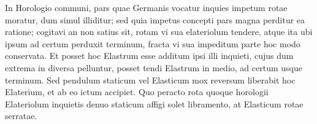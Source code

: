                 \vspace*{8mm}
                \pstart 
                \normalsize
            \noindent[171~r\textsuperscript{o}]
In Horologio\protect{} communi,
pars quae Germanis vocatur inquies\protect{} impetum rotae moratur,
dum simul
illiditur;
sed quia impetus concepti pars magna perditur ea ratione;
cogitavi an non satius sit, rotam vi sua elateriolum\protect{} tendere,
atque ita ubi ipsum ad certum perduxit terminum,
fracta vi sua impeditum
parte hoc modo conservata.
Et posset hoc Elastrum esse additum ipsi illi inquieti,
cujus dum extrema in diversa pelluntur,
posset tendi Elastrum in medio, ad certum usque terminum.
Sed pendulum staticum vel Elasticum mox reversum liberabit hoc Elaterium,
et ab eo ictum accipiet.
Quo peracto rota quoque horologii Elateriolum inquietis denuo
staticum \hspace{-0.15mm}affigi \hspace{-0.2mm}solet \hspace{-0.15mm}libramento,
\hspace{-0.15mm}at \hspace{-0.1mm}Elasticum  \hspace{-0.15mm}rotae \hspace{-0.1mm}ser\-ra\-tae.\pend
 


 

